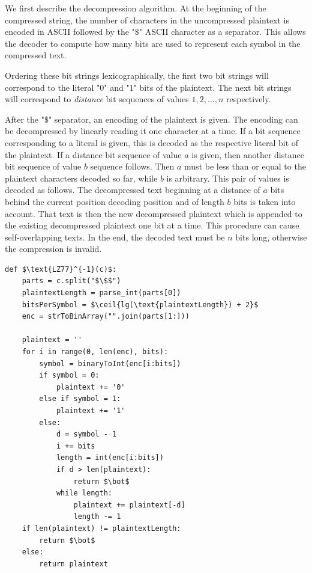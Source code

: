\documentclass[conference, letterpaper, 10pt]{IEEEtran}
\DeclarePairedDelimiter{\ceil}{\lceil}{\rceil}
\begin{document}
We first describe the decompression algorithm. At the beginning of the
compressed string, the number of characters in the uncompressed plaintext is
encoded in ASCII followed by the "$\$$" ASCII character as a separator. This
allows the decoder to compute how many bits are used to represent each symbol
in the compressed text.

Ordering these bit strings lexicographically, the first two bit strings will
correspond to the literal "$0$" and "$1$" bits of the plaintext. The next bit
strings will correspond to \textit{distance} bit sequences of values $1, 2,
\ldots, n$ respectively.

After the "$\$$" separator, an encoding of the plaintext is given. The encoding
can be decompressed by linearly reading it one character at a time. If a bit
sequence corresponding to a literal is given, this is decoded as the respective
literal bit of the plaintext. If a distance bit sequence of value $a$ is given,
then another distance bit sequence of value $b$ sequence follows.  Then $a$
must be less than or equal to the plaintext characters decoded so far, while
$b$ is arbitrary. This pair of values is decoded as follows. The decompressed
text beginning at a distance of $a$ bits behind the current position decoding
position and of length $b$ bits is taken into account. That text is then the
new decompressed plaintext which is appended to the existing decompressed
plaintext one bit at a time. This procedure can cause self-overlapping texts.
In the end, the decoded text must be $n$ bits long, otherwise the compression
is invalid.

\begin{lstlisting}[texcl,mathescape,basicstyle=\small]
def $\text{LZ77}^{-1}(c)$:
    parts = c.split("$\$$")
    plaintextLength = parse_int(parts[0])
    bitsPerSymbol = $\ceil{lg(\text{plaintextLength}) + 2}$
    enc = strToBinArray("".join(parts[1:]))

    plaintext = ''
    for i in range(0, len(enc), bits):
        symbol = binaryToInt(enc[i:bits])
        if symbol = 0:
            plaintext += '0'
        else if symbol = 1:
            plaintext += '1'
        else:
            d = symbol - 1
            i += bits
            length = int(enc[i:bits])
            if d > len(plaintext):
                return $\bot$
            while length:
                plaintext += plaintext[-d]
                length -= 1
    if len(plaintext) != plaintextLength:
        return $\bot$
    else:
        return plaintext
\end{lstlisting}
\end{document}
